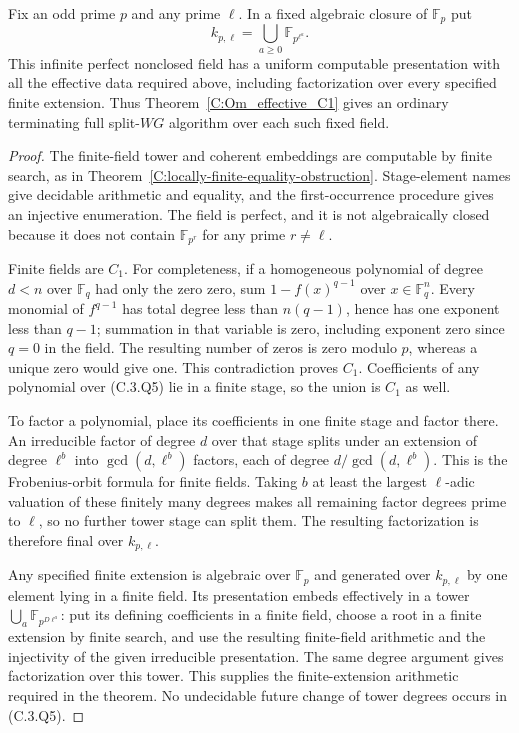 \begin{corollary}
\label{C:C1_tower_example}
Fix an odd prime $p$ and any prime $\ell$. In a fixed algebraic closure
of $\mathbb F_p$ put
\[
                 k_{p,\ell}=\bigcup_{a\ge0}\mathbb F_{p^{\ell^a}}.
                                                               \tag{C.3.Q5}
\]
This infinite perfect nonclosed field has a uniform computable
presentation with all the effective data required above, including
factorization over every specified finite extension. Thus
Theorem~\ref{C:Om_effective_C1} gives an ordinary terminating full
split-$WG$ algorithm over each such fixed field.
\end{corollary}
\begin{proof}
The finite-field tower and coherent embeddings are computable by finite
search, as in Theorem~\ref{C:locally-finite-equality-obstruction}.
Stage-element names give decidable arithmetic and equality, and the
first-occurrence procedure gives an injective enumeration. The field
is perfect, and it is not algebraically closed because it does not
contain $\mathbb F_{p^r}$ for any prime $r\ne\ell$.

Finite fields are $C_1$. For completeness, if a homogeneous polynomial
of degree $d<n$ over $\mathbb F_q$ had only the zero zero, sum
$1-f(x)^{q-1}$ over $x\in\mathbb F_q^n$. Every monomial of
$f^{q-1}$ has total degree less than $n(q-1)$, hence has one exponent
less than $q-1$; summation in that variable is zero, including exponent
zero since $q=0$ in the field. The resulting number of zeros is zero
modulo $p$, whereas a unique zero would give one. This contradiction
proves $C_1$. Coefficients of any polynomial over (C.3.Q5) lie in a
finite stage, so the union is $C_1$ as well.

To factor a polynomial, place its coefficients in one finite stage and
factor there. An irreducible factor of degree $d$ over that stage splits
under an extension of degree $\ell^b$ into $\gcd(d,\ell^b)$ factors,
each of degree $d/\gcd(d,\ell^b)$. This is the Frobenius-orbit formula
for finite fields. Taking $b$ at least the largest $\ell$-adic valuation
of these finitely many degrees makes all remaining factor degrees
prime to $\ell$, so no further tower stage can split them. The resulting
factorization is therefore final over $k_{p,\ell}$.

Any specified finite extension is algebraic over $\mathbb F_p$ and
generated over $k_{p,\ell}$ by one element lying in a finite field.
Its presentation embeds effectively in a tower
$\bigcup_a\mathbb F_{p^{D\ell^a}}$: put its defining coefficients
in a finite field, choose a root in a finite extension by finite search,
and use the resulting finite-field arithmetic and the injectivity of
the given irreducible presentation. The same degree argument gives
factorization over this tower. This supplies the finite-extension
arithmetic required in the theorem. No undecidable future change of
tower degrees occurs in (C.3.Q5).
\end{proof}

